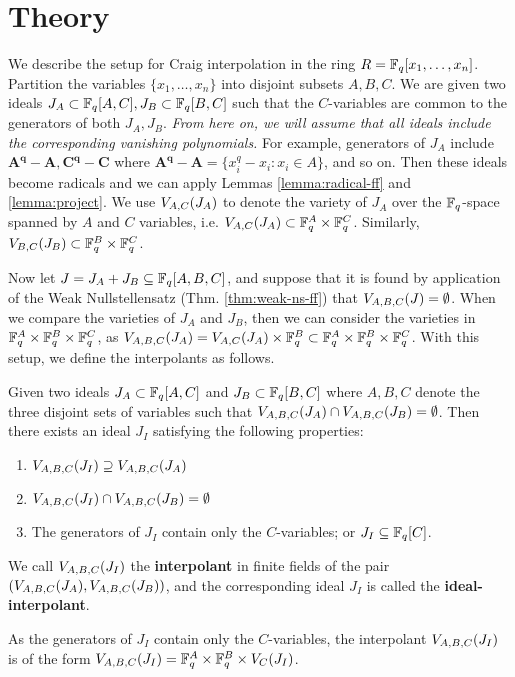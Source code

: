 
\section{Theory}
\label{sec:theory}
We describe the setup for Craig interpolation in the ring
$R={\mathbb{F}}_{q}[x_1,\dots,x_n]$. Partition the variables $\{x_1,\dots,x_n\}$
into disjoint subsets $A, B, C$. We are given two ideals $J_A \subset
{\mathbb{F}}_{q}[A,C], J_B \subset {\mathbb{F}}_{q}[B,C]$ such that the $C$-variables are common
to the generators of both $J_A, J_B$. {\it From here on, we will
  assume that all ideals include the corresponding vanishing
  polynomials.}  For example, generators of $J_A$ include $\bm{A^q -
A, C^q-C}$ where 
$\bm{A^q-A} = \{x_i^q - x_i: x_i \in A\}$, and so on. Then these
ideals become radicals and we can apply Lemmas \ref{lemma:radical-ff}
and \ref{lemma:project}. We use ${V_{A,C}}(J_A)$ to denote the variety of
$J_A$ over the ${\mathbb{F}}_{q}$-space spanned by $A$ and $C$ variables, 
i.e. ${V_{A,C}}(J_A) \subset {\mathbb{F}}_{q}^A \times {\mathbb{F}}_{q}^C$. Similarly,
${V_{B,C}}(J_B)\subset{\mathbb{F}}_{q}^B\times{\mathbb{F}}_{q}^C$. 

Now let $J = J_A + J_B \subseteq {\mathbb{F}}_{q}[A,B,C]$, and suppose that it is
found by application of the Weak Nullstellensatz
(Thm. \ref{thm:weak-ns-ff}) that ${V_{A,B,C}}(J) = \emptyset$. When we
compare the varieties of $J_A$ and $J_B$, then we can consider the
varieties in ${\mathbb{F}}_{q}^A\times{\mathbb{F}}_{q}^B\times{\mathbb{F}}_{q}^C$,  as ${V_{A,B,C}}(J_A) =
{V_{A,C}}(J_A) \times {\mathbb{F}}_{q}^B \subset {\mathbb{F}}_{q}^A\times{\mathbb{F}}_{q}^B\times{\mathbb{F}}_{q}^C$. With this
setup, we define the interpolants as follows.


\begin{Definition}
\label{def:int}
Given two ideals $J_A \subset {\mathbb{F}}_{q}[A,C]$ and $J_B \subset {\mathbb{F}}_{q}[B,C]$
where $A,B,C$ denote the three disjoint sets of variables such that 
${V_{A,B,C}}(J_A) \cap {V_{A,B,C}}(J_B) = \emptyset$. Then there exists an ideal 
$J_I$ satisfying the following properties:
\begin{enumerate}
\item ${V_{A,B,C}}(J_I) \supseteq {V_{A,B,C}}(J_A)$
\item ${V_{A,B,C}}(J_I) \cap {V_{A,B,C}}(J_B) = \emptyset$
\item The generators of $J_I$ contain only the $C$-variables;
 or $J_I \subseteq {\mathbb{F}}_{q}[C]$.
\end{enumerate}
We call ${V_{A,B,C}}(J_I)$ the {\bf interpolant} in finite fields of the
pair $({V_{A,B,C}}(J_A), {V_{A,B,C}}(J_B))$, and the corresponding ideal $J_I$ is
called the {\bf ideal-interpolant}. 
\end{Definition}

As the generators of $J_I$ contain only the $C$-variables, the
interpolant ${V_{A,B,C}}(J_I)$ is of the form ${V_{A,B,C}}(J_I) =
{\mathbb{F}}_{q}^A\times{\mathbb{F}}_{q}^B\times{V_C}(J_I)$. 


